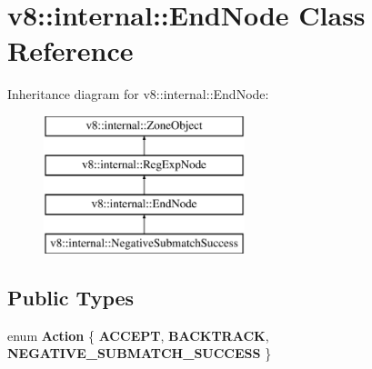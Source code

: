 \hypertarget{classv8_1_1internal_1_1_end_node}{}\section{v8\+:\+:internal\+:\+:End\+Node Class Reference}
\label{classv8_1_1internal_1_1_end_node}
Inheritance diagram for v8\+:\+:internal\+:\+:End\+Node\+:\begin{figure}[H]
\begin{center}
\leavevmode
\includegraphics[height=4.000000cm]{classv8_1_1internal_1_1_end_node}
\end{center}
\end{figure}
\subsection*{Public Types}
\begin{DoxyCompactItemize}
\item 
\hypertarget{classv8_1_1internal_1_1_end_node_abac30d22b1fc00be81e100180e4ca83a}{}enum {\bfseries Action} \{ {\bfseries A\+C\+C\+E\+P\+T}, 
{\bfseries B\+A\+C\+K\+T\+R\+A\+C\+K}, 
{\bfseries N\+E\+G\+A\+T\+I\+V\+E\+\_\+\+S\+U\+B\+M\+A\+T\+C\+H\+\_\+\+S\+U\+C\+C\+E\+S\+S}
 \}\label{classv8_1_1internal_1_1_end_node_abac30d22b1fc00be81e100180e4ca83a}

\end{DoxyCompactItemize}
